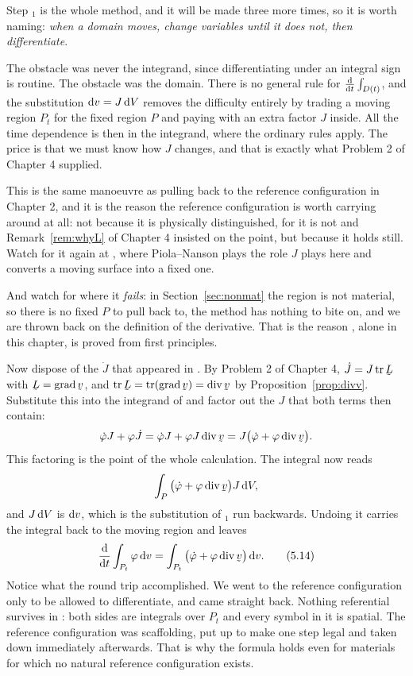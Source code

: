 \begin{remark}\label{rem:pullback}
Step $_{1}$ is the whole method, and it will be made three more
times, so it is worth naming: \emph{when a domain moves, change variables
until it does not, then differentiate}.

The obstacle was never the integrand, since differentiating under an
integral sign is routine. The obstacle was the domain. There is no general rule for
$\frac{\mathrm{d}}{\mathrm{d} t}\int_{D(t)}$, and the substitution $\mathrm{d} v=J\,\mathrm{d} V$
removes the difficulty entirely by trading a moving region $P_{t}$ for the
fixed region $P$ and paying with an extra factor $J$ inside. All the time
dependence is then in the integrand, where the ordinary rules apply. The
price is that we must know how $J$ changes, and that is exactly what
Problem 2 of Chapter 4 supplied.

This is the same manoeuvre as pulling back to the reference configuration
in Chapter 2, and it is the reason the reference configuration is worth
carrying around at all: not because it is physically distinguished, for it is not and
Remark~\ref{rem:whyL} of Chapter 4 insisted on the point, but because it
holds still. Watch for it again at , where
Piola--Nanson plays the role $J$ plays here and converts a moving surface
into a fixed one.

And watch for where it \emph{fails}: in Section~\ref{sec:nonmat} the
region is not material, so there is no fixed $P$ to pull back to, the
method has nothing to bite on, and we are thrown back on the definition of
the derivative. That is the reason , alone in this chapter, is
proved from first principles.
\end{remark}

Now dispose of the $\dot J$ that appeared in . By Problem 2 of
Chapter 4, $\dot J=J\tr\bL$ with $\bL=\grad\bv$, and
$\tr\bL=\tr(\grad\bv)=\dvg\bv$ by Proposition~\ref{prop:divv}. Substitute
this into the integrand of  and factor out the $J$ that both
terms then contain:
\[
   \dot\varphi J+\varphi\dot J
   =\dot\varphi J+\varphi J\dvg\bv
   =J\big(\dot\varphi+\varphi\dvg\bv\big).
\]
This factoring is the point of the whole calculation. The integral now
reads
\[
   \int_{P}\big(\dot\varphi+\varphi\dvg\bv\big)J\,\dl V ,
\]
and $J\,\mathrm{d} V$ is $\mathrm{d} v$, which is the substitution of $_{1}$
run backwards. Undoing it carries the integral back to the moving region
and leaves
\begin{equation}
   \frac{\dl}{\dl t}\int_{P_{t}}\varphi\,\dl v
   =\int_{P_{t}}\big(\dot\varphi+\varphi\dvg\bv\big)\,\dl v .
   \tag{5.14}\label{eq:5.14}
\end{equation}
Notice what the round trip accomplished. We went to the reference
configuration only to be allowed to differentiate, and came straight back.
Nothing referential survives in : both sides are integrals over
$P_{t}$ and every symbol in it is spatial. The reference configuration was
scaffolding, put up to make one step legal and taken down immediately
afterwards. That is why the formula holds even for materials for which no
natural reference configuration exists.


